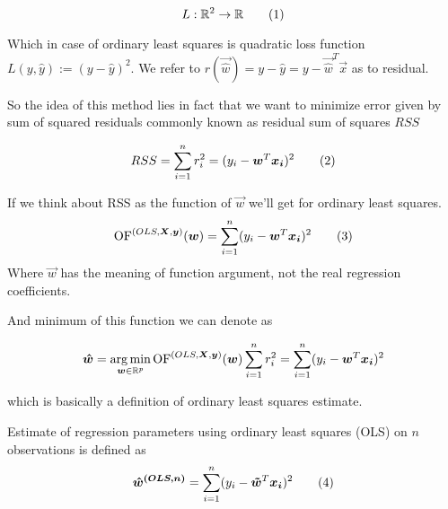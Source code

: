 \begin{equation}
L : \mathbb{R}^2 \rightarrow  \mathbb{R} \numberthis
\end{equation}

Which in case of ordinary least squares is quadratic loss function $L(y, \hat{y}) := (y - \hat{y})^2$. We refer to $r(\vec{\hat{w}}) = y - \hat{y} = y - \vec{\hat{w}}^T\vec{x} $ as to residual. 

So the idea of this method lies in fact that we want to minimize error given by sum of squared residuals commonly known as residual sum of squares $RSS$

\begin{equation}
    RSS = \sum\limits_{i=1}^n r_i^2 = (y_i - \vec{w}^T\vec{x_i})^2 \numberthis
\end{equation}

\begin{definition} If we think about RSS as the function of $\vec{w}$ we'll get  for ordinary least squares. 
    \begin{equation}
        \of^{(OLS,\vec{X}, \vec{y})}(\vec{w}) = \sum\limits_{i=1}^n (y_i - \vec{w}^T\vec{x_i})^2 \numberthis
    \end{equation}
Where $\vec{w}$ has the meaning of function argument, not the real regression coefficients.
\end{definition}

And minimum of this function we can denote as 




\begin{equation}
    \boldsymbol{\hat{w}} = \operatorname*{arg\,min}_{\boldsymbol{w} \in \mathbb{R}^p} \operatorname{OF}^{(OLS,\boldsymbol{X}, \boldsymbol{y})}(\boldsymbol{w}) 
    \sum\limits_{i=1}^n r_i^2 = \sum\limits_{i=1}^n (y_i - \boldsymbol{w}^T\boldsymbol{x_i})^2 
\end{equation}

which is basically a definition of ordinary least squares estimate.

\begin{definition} Estimate of regression parameters using ordinary least squares (OLS) on $n$ observations is defined as
    \begin{equation}
        \vec{\hat{w}^{(OLS, n)}} =  \sum\limits_{i=1}^n (y_i - \vec{\tilde{w}}^T\vec{x_i})^2 \numberthis
    \end{equation}
\end{definition}

